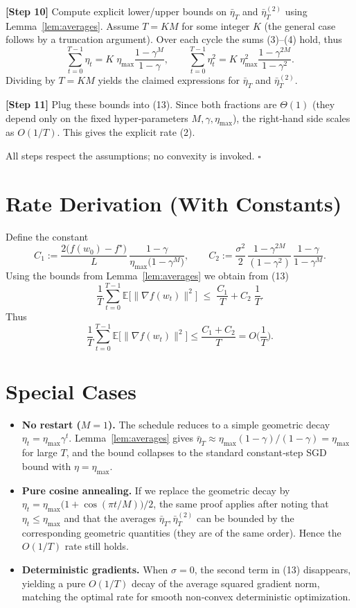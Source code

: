 \documentclass[11pt]{article}
\newcommand{\E}{\mathbb{E}}
\begin{document}
\noindent\textbf{[Step 10]} Compute explicit lower/upper bounds on $\bar\eta_T$ and $\bar\eta_T^{(2)}$ using Lemma~\ref{lem:averages}.  
Assume $T=K M$ for some integer $K$ (the general case follows by a truncation argument). Over each cycle the sums (3)–(4) hold, thus
\[
\sum_{t=0}^{T-1}\eta_t
=K\;\eta_{\max}\frac{1-\gamma^{M}}{1-\gamma},
\qquad
\sum_{t=0}^{T-1}\eta_t^{2}
=K\;\eta_{\max}^{2}\frac{1-\gamma^{2M}}{1-\gamma^{2}}.
\]
Dividing by $T=KM$ yields the claimed expressions for $\bar\eta_T$ and $\bar\eta_T^{(2)}$.

\noindent\textbf{[Step 11]} Plug these bounds into (13). Since both fractions are $\Theta(1)$ (they depend only on the fixed hyper‑parameters $M,\gamma,\eta_{\max}$), the right‑hand side scales as $O(1/T)$. This gives the explicit rate (2).

All steps respect the assumptions; no convexity is invoked. \hfill $\square$

\section*{Rate Derivation (With Constants)}
Define the constant
\[
C_1:=\frac{2\big(f(w_0)-f^{\star}\big)}{L}\,
\frac{1-\gamma}{\eta_{\max}\big(1-\gamma^{M}\big)},
\qquad
C_2:=\frac{\sigma^{2}}{2}\,
\frac{1-\gamma^{2M}}{(1-\gamma^{2})}\,
\frac{1-\gamma}{1-\gamma^{M}}.
\]
Using the bounds from Lemma~\ref{lem:averages} we obtain from (13)
\[
\frac{1}{T}\sum_{t=0}^{T-1}\E\big[\|\nabla f(w_t)\|^{2}\big]
\;\le\;
\frac{C_1}{T}+C_2\;\frac{1}{T}.
\]
Thus
\[
\boxed{\displaystyle
\frac{1}{T}\sum_{t=0}^{T-1}\E\big[\|\nabla f(w_t)\|^{2}\big]
\le \frac{C_1+C_2}{T}=O\!\Big(\frac{1}{T}\Big).}
\]

\section*{Special Cases}
\begin{itemize}
\item \textbf{No restart ($M=1$).} The schedule reduces to a simple geometric decay $\eta_t=\eta_{\max}\gamma^{t}$. Lemma~\ref{lem:averages} gives $\bar\eta_T\approx \eta_{\max}(1-\gamma)/(\!1-\gamma) =\eta_{\max}$ for large $T$, and the bound collapses to the standard constant‑step SGD bound with $\eta=\eta_{\max}$.
\item \textbf{Pure cosine annealing.} If we replace the geometric decay by $\eta_t=\eta_{\max}\big(1+\cos(\pi t/M)\big)/2$, the same proof applies after noting that $\eta_t\le\eta_{\max}$ and that the averages $\bar\eta_T,\bar\eta_T^{(2)}$ can be bounded by the corresponding geometric quantities (they are of the same order). Hence the $O(1/T)$ rate still holds.
\item \textbf{Deterministic gradients.} When $\sigma=0$, the second term in (13) disappears, yielding a pure $O(1/T)$ decay of the average squared gradient norm, matching the optimal rate for smooth non‑convex deterministic optimization.
\end{itemize}
\end{document}
